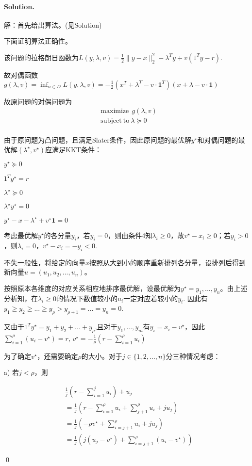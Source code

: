 \documentclass[a4paper]{article}
\newenvironment{solution}
{\color{blue} \paragraph{Solution.}}
{\newline \qed}
\begin{document}
\begin{solution}
    解：首先给出算法。(见Solution)

    下面证明算法正确性。

    该问题的拉格朗日函数为$L(y, \lambda, v)=\frac 12\|y-x\|_2^2-\lambda^T y+v(1^Ty-r)$.

    故对偶函数$g(\lambda, v)=\inf_{n\in D}L(y, \lambda, v)=-\frac 12(x^T+\lambda^T-v\cdot \mathbf{1}^T)(x+\lambda-v\cdot \mathbf{1})$

    故原问题的对偶问题为
        \begin{equation}
            \begin{split}
                &\text{maximize}\ \ g(\lambda, v)\\
                &\text{subject}\ \text{to}\ \lambda\succeq 0\\
            \end{split}
        \end{equation}

    由于原问题为凸问题，且满足Slater条件，因此原问题的最优解$y^\star$和对偶问题的最优解$(\lambda^\star, v^\star)$应满足KKT条件：

    $y^\star\succeq 0$

    $1^Ty^\star=r$

    $\lambda^\star\succeq 0$

    $\lambda^\star y^\star=0$

    $y^\star-x-\lambda^\star+v^\star \mathbf{1}=0$

    考虑最优解$y^\star$的各分量$y_i$，若$y_i=0$，则由条件4知$\lambda_i \geq0$，故$v^\star -x_i\geq 0$；若$y_i >0$，则$\lambda_i=0$，$v^\star -x_i =-y_i<0$.

    不失一般性，将给定的向量$x$按照从大到小的顺序重新排列各分量，设排列后得到新向量$u=(u_1, u_2, ...,u_n)$。
    
    按照原本各维度的对应关系相应地排序最优解，设最优解为$y^\star={y_1, ...,y_n}$。由上述分析知，在$\lambda_i\geq 0$的情况下数值较小的$u_i$一定对应着较小的$y_i$. 因此有$y_1\geq y_2\geq ...\geq y_{\rho} > y_{\rho+1}=...=y_n=0$.

    又由于$1^Ty^\star=y_1+y_2+...+y_{\rho}$,且对于$y_1, ...,y_m$有$y_i=x_i-v^\star$，因此$\sum_{i=1}^\rho(u_i-v^\star)=r$, $v^\star=-\frac 1\rho (r-\sum_{i=1}^\rho u_i)$

    为了确定$v^\star$，还需要确定$\rho$的大小。对于$j\in\{1, 2, ...,n\}$分三种情况考虑：

    a) 若$j<\rho$，则

    \begin{equation}
        \begin{split}
            &\frac 1j(r-\sum_{i=1}^ju_i)+u_j\\
            &=\frac 1j(r-\sum_{i=1}^\rho u_i+\sum_{j+1}^\rho u_i+ju_j)\\
            &=\frac 1j(-\rho v^\star+\sum_{i=j+1}^\rho u_i+ju_j)\\
            &=\frac 1j(j(u_j-v^\star)+\sum_{i=j+1}^\rho(u_i-v^\star))
        \end{split}
    \end{equation}
        

\end{solution}
\end{document}

